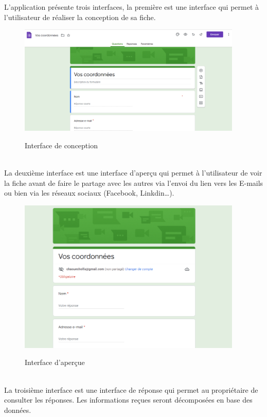 \newpage
L’application présente trois interfaces, la première est une interface qui permet à l’utilisateur de réaliser la conception de sa fiche. \\
\begin{figure}[!h]
	\centering
	{\includegraphics[width=0.95\textwidth]{D) IMAGES/for2.png}}
	\caption{Interface de conception}
	\label{Org}
\end{figure}\\
La deuxième interface est une interface d’aperçu qui permet à l’utilisateur de voir la fiche avant de faire le partage avec les autres via l’envoi du lien vers les E-mails ou bien via les réseaux sociaux (Facebook, Linkdin…).\\
\begin{figure}[!h]
	\centering
	{\includegraphics[width=0.95\textwidth]{D) IMAGES/forapp.png}}
	\caption{Interface d'aperçue}
	\label{Org}
\end{figure}
\\
La troisième interface est une interface de réponse qui permet au propriétaire de consulter les réponses. Les informations reçues seront décomposées en base des données.
